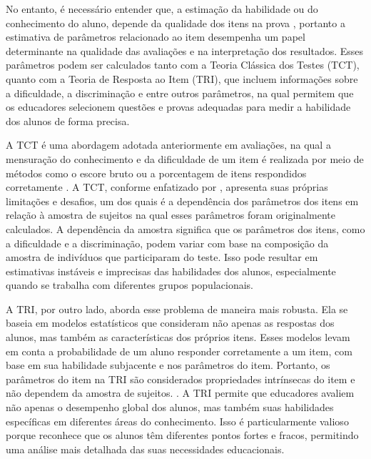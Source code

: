 No entanto, é necessário entender que, a estimação da habilidade ou do conhecimento do aluno, depende da qualidade dos itens na prova \cite{BORGATTO2012}, portanto a estimativa de parâmetros relacionado ao item desempenha um papel determinante na qualidade das avaliações e na interpretação dos resultados. Esses parâmetros podem ser calculados tanto com a Teoria Clássica dos Testes (TCT), quanto com a Teoria de Resposta ao Item (TRI), que incluem informações sobre a dificuldade, a discriminação e entre outros parâmetros, na qual permitem que os educadores selecionem questões e provas adequadas para medir a habilidade dos alunos de forma precisa. 

A TCT é uma abordagem adotada anteriormente em avaliações, na qual a mensuração do conhecimento e da dificuldade de um item é realizada por meio de métodos como o escore bruto ou a porcentagem de itens respondidos corretamente \cite{pasquali2003}. A TCT, conforme enfatizado por , apresenta suas próprias limitações e desafios, um dos quais é a dependência dos parâmetros dos itens em relação à amostra de sujeitos na qual esses parâmetros foram originalmente calculados. A dependência da amostra significa que os parâmetros dos itens, como a dificuldade e a discriminação, podem variar com base na composição da amostra de indivíduos que participaram do teste. Isso pode resultar em estimativas instáveis e imprecisas das habilidades dos alunos, especialmente quando se trabalha com diferentes grupos populacionais.

\begin{comment}
	 É importante ressaltar que, de acordo com Pasquali (2003), a TCT não mede diretamente o traço latente e sim avalia o comportamento observado dos alunos em relação aos itens.
\end{comment}


A TRI, por outro lado, aborda esse problema de maneira mais robusta. Ela se baseia em modelos estatísticos que consideram não apenas as respostas dos alunos, mas também as características dos próprios itens. Esses modelos levam em conta a probabilidade de um aluno responder corretamente a um item, com base em sua habilidade subjacente e nos parâmetros do item. Portanto, os parâmetros do item na TRI são considerados propriedades intrínsecas do item e não dependem da amostra de sujeitos. \cite{pasquali2018}. A TRI permite que educadores avaliem não apenas o desempenho global dos alunos, mas também suas habilidades específicas em diferentes áreas do conhecimento. Isso é particularmente valioso porque reconhece que os alunos têm diferentes pontos fortes e fracos, permitindo uma análise mais detalhada das suas necessidades educacionais. 

